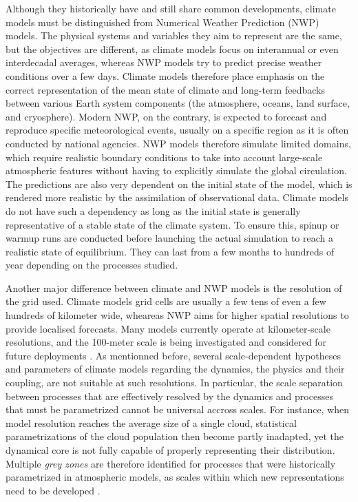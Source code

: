 Although they historically have and still share common developments, climate models must be distinguished from  Numerical Weather Prediction (NWP) models.
The physical systems and variables they aim to represent are the same, but the objectives are different, as climate models focus on interannual or even interdecadal averages, whereas NWP models try to predict precise weather conditions over a few days. 
Climate models therefore place emphasis on the correct representation of the mean state of climate and long-term feedbacks between various Earth system components (the atmosphere, oceans, land surface, and cryosphere).
Modern NWP, on the contrary, is expected to forecast and reproduce specific meteorological events, usually on a specific region as it is often conducted by national agencies. NWP models therefore simulate limited domains, which require realistic boundary conditions to take into account large-scale atmospheric features without having to explicitly simulate the global circulation. 
The predictions are also very dependent on the initial state of the model, which is rendered more realistic by the assimilation of observational data. Climate models do not have such a dependency as long as the initial state is generally representative of a stable state of the climate system. To ensure this, spinup or warmup runs are conducted before launching the actual simulation to reach a realistic state of equilibrium. They can last from a few months to hundreds of year depending on the processes studied.

Another major difference between climate and NWP models is the resolution of the grid used. Climate models grid cells are usually a few tens of even a few hundreds of kilometer wide, wheareas NWP aims for higher spatial resolutions to provide localised forecasts. Many models currently operate at kilometer-scale resolutions, and the 100-meter scale is being investigated and considered for future deployments \citep{lean_hectometric_2024}.
As mentionned before, several scale-dependent hypotheses and parameters of climate models regarding the dynamics, the physics and their coupling, are not suitable at such resolutions. In particular, the scale separation between processes that are effectively resolved by the dynamics and processes that must be parametrized cannot be universal accross scales. For instance, when model resolution reaches the average size of a single cloud, statistical parametrizations of the cloud population then become partly inadapted, yet the dynamical core is not fully capable of properly representing their distribution. Multiple \textit{grey zones} are therefore identified for processes that were historically parametrized in atmospheric models, as scales within which new representations need to be developed \citep{wei_research_2024,frassoni_building_2018,chow_crossing_2019}.

